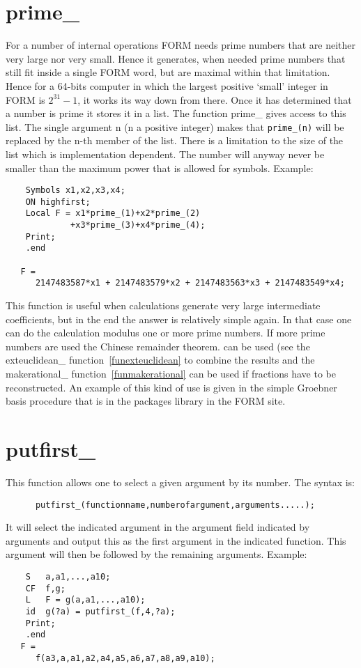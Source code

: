 
\section{prime\_}
\label{funprime}

\noindent For a number of internal operations FORM needs prime numbers that 
are neither very large nor very small. Hence it generates, when needed 
prime numbers that still fit inside a single FORM word, but are maximal 
within that limitation. Hence for a 64-bits computer in which the largest 
positive `small' integer in FORM is $2^{31}-1$, it works its way down from 
there. Once it has determined that a number is prime it stores it in a 
list. The function prime\_ gives access to this list. The single argument 
n (n a positive integer) makes that \verb:prime_(n): will be replaced by 
the n-th member of the list. There is a limitation to the size of the list 
which is implementation dependent. The number will anyway never be smaller 
than the maximum power that is allowed for symbols. Example:
\begin{verbatim}
    Symbols x1,x2,x3,x4;
    ON highfirst;
    Local F = x1*prime_(1)+x2*prime_(2)
             +x3*prime_(3)+x4*prime_(4);
    Print;
    .end

   F =
      2147483587*x1 + 2147483579*x2 + 2147483563*x3 + 2147483549*x4;
\end{verbatim}
This function is useful when calculations generate very large intermediate 
coefficients, but in the end the answer is relatively simple again. In that 
case one can do the calculation modulus one or more prime numbers. If more 
prime numbers are used the Chinese remainder theorem. can be used (see the exteuclidean\_ 
function~\ref{funexteuclidean} to combine the results and the 
makerational\_ function~\ref{funmakerational} can be used if fractions have 
to be reconstructed. An example of this kind of use is given in the simple 
Groebner basis procedure that is in the packages library in the FORM site.


\section{putfirst\_}
\label{funputfirst}

\noindent 
This function allows one to select a given argument by its number. The 
syntax is:
\begin{verbatim}
      putfirst_(functionname,numberofargument,arguments.....);
\end{verbatim}
It will select the indicated argument in the argument field indicated by 
arguments and output this as the first argument in the indicated function. 
This argument will then be followed by the remaining arguments.
Example:
\begin{verbatim}
    S   a,a1,...,a10;
    CF  f,g;
    L   F = g(a,a1,...,a10);
    id  g(?a) = putfirst_(f,4,?a);
    Print;
    .end
   F =
      f(a3,a,a1,a2,a4,a5,a6,a7,a8,a9,a10);
\end{verbatim}

